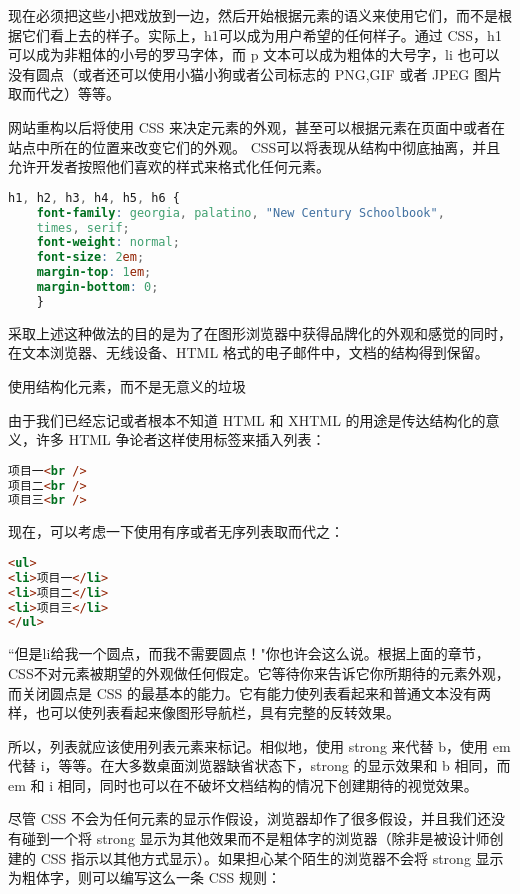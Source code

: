 \begin{compactenum}
现在必须把这些小把戏放到一边，然后开始根据元素的语义来使用它们，而不是根据它们看上去的样子。实际上，h1可以成为用户希望的任何样子。通过 CSS，h1 可以成为非粗体的小号的罗马字体，而 p 文本可以成为粗体的大号字，li 也可以没有圆点（或者还可以使用小猫小狗或者公司标志的 PNG,GIF 或者 JPEG 图片取而代之）等等。

网站重构以后将使用 CSS 来决定元素的外观，甚至可以根据元素在页面中或者在站点中所在的位置来改变它们的外观。 CSS可以将表现从结构中彻底抽离，并且允许开发者按照他们喜欢的样式来格式化任何元素。

\begin{lstlisting}[language=CSS]
h1, h2, h3, h4, h5, h6 {
	font-family: georgia, palatino, "New Century Schoolbook",
	times, serif;
	font-weight: normal;
	font-size: 2em;
	margin-top: 1em;
	margin-bottom: 0;
	}
\end{lstlisting}

采取上述这种做法的目的是为了在图形浏览器中获得品牌化的外观和感觉的同时，在文本浏览器、无线设备、HTML 格式的电子邮件中，文档的结构得到保留。

\item 使用结构化元素，而不是无意义的垃圾

由于我们已经忘记或者根本不知道 HTML 和 XHTML 的用途是传达结构化的意义，许多 HTML 争论者这样使用标签来插入列表：

\begin{lstlisting}[language=HTML]
项目一<br />
项目二<br />
项目三<br />
\end{lstlisting}

现在，可以考虑一下使用有序或者无序列表取而代之：

\begin{lstlisting}[language=HTML]
<ul>
<li>项目一</li>
<li>项目二</li>
<li>项目三</li>
</ul>
\end{lstlisting}

``但是li给我一个圆点，而我不需要圆点！"你也许会这么说。根据上面的章节，CSS不对元素被期望的外观做任何假定。它等待你来告诉它你所期待的元素外观，而关闭圆点是 CSS 的最基本的能力。它有能力使列表看起来和普通文本没有两样，也可以使列表看起来像图形导航栏，具有完整的反转效果。

所以，列表就应该使用列表元素来标记。相似地，使用 strong 来代替 b，使用 em 代替 i，等等。在大多数桌面浏览器缺省状态下，strong 的显示效果和 b 相同，而 em 和 i 相同，同时也可以在不破坏文档结构的情况下创建期待的视觉效果。

尽管 CSS 不会为任何元素的显示作假设，浏览器却作了很多假设，并且我们还没有碰到一个将 strong 显示为其他效果而不是粗体字的浏览器（除非是被设计师创建的 CSS 指示以其他方式显示）。如果担心某个陌生的浏览器不会将 strong 显示为粗体字，则可以编写这么一条 CSS 规则：


\end{compactenum}
